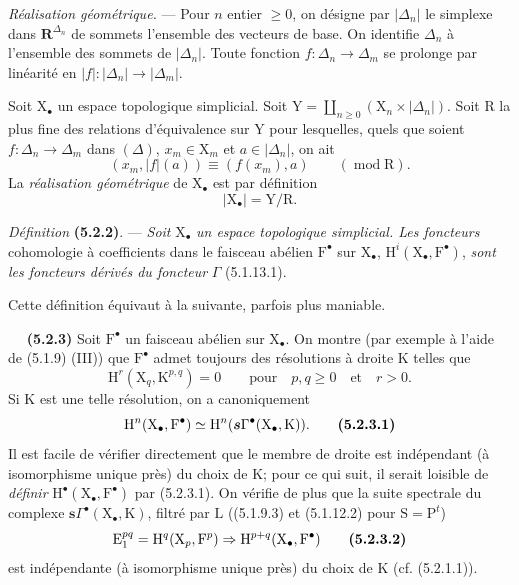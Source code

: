 \documentclass[11pt,leqno]{article}
\newcommand{\Page}[1]{\ifvmode\noindent\else\unskip\ \fi{\footnotesize\textcolor{gray}{[p.\,#1]}}\ \ignorespaces}
\begin{document}
\textit{Réalisation géométrique.} — Pour \(n\) entier \(\geq0\), on désigne par \(\lvert\Delta_n\rvert\) le simplexe dans \(\mathbf{R}^{\Delta_n}\) de sommets l’ensemble des vecteurs de base. On identifie \(\Delta_n\) à l’ensemble des sommets de \(\lvert\Delta_n\rvert\). Toute fonction \(f:\Delta_n\to\Delta_m\) se prolonge par linéarité en \(\lvert f\rvert:\lvert\Delta_n\rvert\to\lvert\Delta_m\rvert\).

Soit \(\mathrm{X}_{\bullet}\) un espace topologique simplicial. Soit \(\mathrm{Y}=\coprod\limits_{n\geq0}(\mathrm{X}_n\times\lvert\Delta_n\rvert)\). Soit \(\mathrm{R}\) la plus fine des relations d’équivalence sur \(\mathrm{Y}\) pour lesquelles, quels que soient \(f:\Delta_n\to\Delta_m\) dans \((\Delta)\), \(x_m\in\mathrm{X}_m\) et \(a\in\lvert\Delta_n\rvert\), on ait
\[
(x_m,\lvert f\rvert(a))\equiv(f(x_m),a)\qquad(\operatorname{mod}\mathrm{R}).
\]
La \textit{réalisation géométrique} de \(\mathrm{X}_{\bullet}\) est par définition
\[
\lvert\mathrm{X}_{\bullet}\rvert=\mathrm{Y}/\mathrm{R}.
\]

\textit{Définition} \textbf{(5.2.2)}. — \textit{Soit} \(\mathrm{X}_{\bullet}\) \textit{un espace topologique simplicial. Les foncteurs} cohomologie à coefficients dans le faisceau abélien \(\mathrm{F}^{\bullet}\) sur \(\mathrm{X}_{\bullet}\), \(\mathrm{H}^i(\mathrm{X}_{\bullet},\mathrm{F}^{\bullet})\), \textit{sont les foncteurs dérivés du foncteur} \(\Gamma\) (5.1.13.1).

Cette définition équivaut à la suivante, parfois plus maniable.

\Page{13}
\textbf{(5.2.3)} Soit \(\mathrm{F}^{\bullet}\) un faisceau abélien sur \(\mathrm{X}_{\bullet}\). On montre (par exemple à l’aide de (5.1.9) (III)) que \(\mathrm{F}^{\bullet}\) admet toujours des résolutions à droite \(\mathrm{K}\) telles que
\[
\mathrm{H}^{r}(\mathrm{X}_{q},\mathrm{K}^{p,q})=0
\qquad \text{pour}\quad p,q\geq 0
\quad\text{et}\quad r>0.
\]
Si \(\mathrm{K}\) est une telle résolution, on a canoniquement
\[
\mathrm{H}^{n}(\mathrm{X}_{\bullet},\mathrm{F}^{\bullet})
\simeq
\mathrm{H}^{n}(\boldsymbol{s}\Gamma^{\bullet}(\mathrm{X}_{\bullet},\mathrm{K})).
\tag*{\textbf{(5.2.3.1)}}
\]
Il est facile de vérifier directement que le membre de droite est indépendant (à isomorphisme unique près) du choix de \(\mathrm{K}\); pour ce qui suit, il serait loisible de \textit{définir} \(\mathrm{H}^{\bullet}(\mathrm{X}_{\bullet},\mathrm{F}^{\bullet})\) par (5.2.3.1). On vérifie de plus que la suite spectrale du complexe \(\boldsymbol{s}\Gamma^{\bullet}(\mathrm{X}_{\bullet},\mathrm{K})\), filtré par \(\mathrm{L}\) ((5.1.9.3) et (5.1.12.2) pour \(\mathrm{S}=\mathrm{P}^{t}\))
\[
\mathrm{E}_{1}^{pq}=\mathrm{H}^{q}(\mathrm{X}_{p},\mathrm{F}^{p})
\Rightarrow
\mathrm{H}^{p+q}(\mathrm{X}_{\bullet},\mathrm{F}^{\bullet})
\tag*{\textbf{(5.2.3.2)}}
\]
est indépendante (à isomorphisme unique près) du choix de \(\mathrm{K}\) (cf. (5.2.1.1)).
\end{document}
